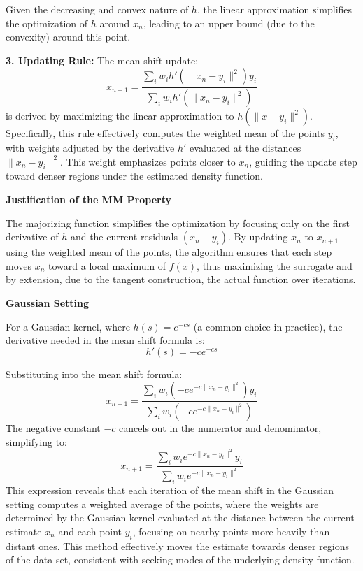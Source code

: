 \documentclass[8pt]{article}
\begin{document}
   Given the decreasing and convex nature of \(h\), the linear approximation simplifies the optimization of \(h\) around \(x_n\), leading to an upper bound (due to the convexity) around this point.

\textbf{3. Updating Rule:}
   The mean shift update:
   \[
   x_{n+1} = \frac{\sum_i w_i h'(\|x_n - y_i\|^2) y_i}{\sum_i w_i h'(\|x_n - y_i\|^2)}
   \]
   is derived by maximizing the linear approximation to \(h(\|x - y_i\|^2)\). Specifically, this rule effectively computes the weighted mean of the points \(y_i\), with weights adjusted by the derivative \(h'\) evaluated at the distances \(\|x_n - y_i\|^2\). This weight emphasizes points closer to \(x_n\), guiding the update step toward denser regions under the estimated density function.

\textbf{Justification of the MM Property}

The majorizing function simplifies the optimization by focusing only on the first derivative of \(h\) and the current residuals \((x_n - y_i)\). By updating \(x_n\) to \(x_{n+1}\) using the weighted mean of the points, the algorithm ensures that each step moves \(x_n\) toward a local maximum of \(f(x)\), thus maximizing the surrogate and by extension, due to the tangent construction, the actual function over iterations.

\textbf{Gaussian Setting}

For a Gaussian kernel, where \( h(s) = e^{-cs} \) (a common choice in practice), the derivative needed in the mean shift formula is:
\[
h'(s) = -c e^{-cs}
\]

Substituting into the mean shift formula:
\[
x_{n+1} = \frac{\sum_i w_i (-c e^{-c\|x_n - y_i\|^2}) y_i}{\sum_i w_i (-c e^{-c\|x_n - y_i\|^2})}
\]
The negative constant \( -c \) cancels out in the numerator and denominator, simplifying to:
\[
x_{n+1} = \frac{\sum_i w_i e^{-c\|x_n - y_i\|^2} y_i}{\sum_i w_i e^{-c\|x_n - y_i\|^2}}
\]
This expression reveals that each iteration of the mean shift in the Gaussian setting computes a weighted average of the points, where the weights are determined by the Gaussian kernel evaluated at the distance between the current estimate \(x_n\) and each point \(y_i\), focusing on nearby points more heavily than distant ones. This method effectively moves the estimate towards denser regions of the data set, consistent with seeking modes of the underlying density function.
\end{document}
